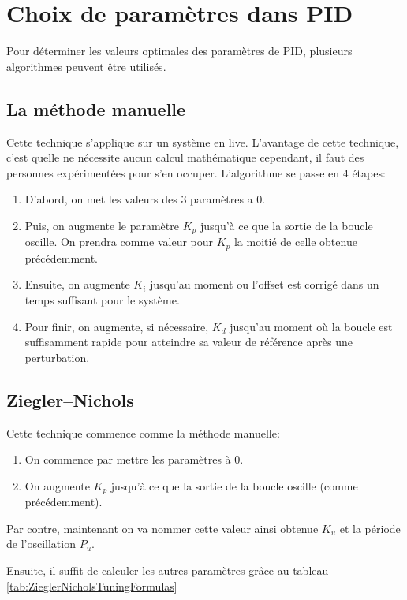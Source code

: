 \section{Choix de paramètres dans PID}

Pour déterminer les valeurs optimales des paramètres de PID, plusieurs algorithmes peuvent être utilisés.

\subsection{La méthode manuelle}
Cette technique s'applique sur un système en live.
L'avantage de cette technique, c'est quelle ne nécessite aucun calcul mathématique cependant, il faut des personnes expérimentées pour s'en occuper.
L'algorithme se passe en 4 étapes:
\begin{enumerate}
	\item D'abord, on met les valeurs des 3 paramètres a 0.
	\item Puis, on augmente le paramètre $K_p$ jusqu'à ce que la sortie de la boucle oscille.
	On prendra comme valeur pour $K_p$ la moitié de celle obtenue précédemment.
	\item Ensuite, on augmente $K_i$ jusqu'au moment ou l'offset est corrigé dans un temps suffisant pour le système.
	\item Pour finir, on augmente, si nécessaire, $K_d$ jusqu'au moment où la boucle est suffisamment rapide pour atteindre sa valeur de référence après une perturbation.
\end{enumerate}

\subsection{Ziegler–Nichols}
Cette technique commence comme la méthode manuelle:
\begin{enumerate}
	\item On commence par mettre les paramètres à 0.
	\item On augmente $K_p$ jusqu'à ce que la sortie de la boucle oscille (comme précédemment).
\end{enumerate}
Par contre, maintenant on va nommer cette valeur ainsi obtenue $K_u$ et la période de l'oscillation $P_u$.

Ensuite, il suffit de calculer les autres paramètres grâce au tableau \ref{tab:ZieglerNicholsTuningFormulas}

